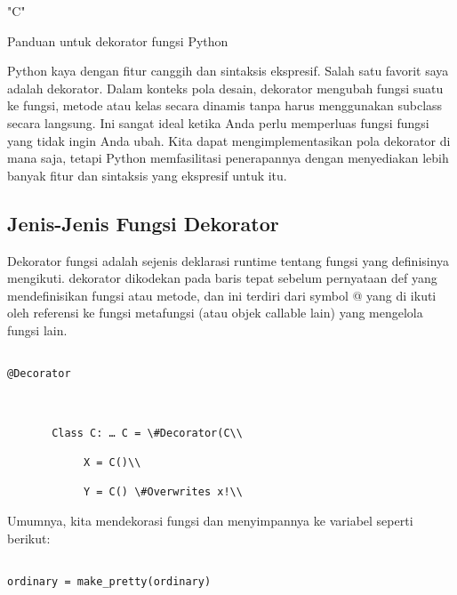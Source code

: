 "C"





Panduan untuk dekorator fungsi Python

Python kaya dengan fitur canggih dan sintaksis ekspresif. Salah satu favorit saya adalah dekorator. Dalam konteks pola desain, dekorator mengubah fungsi suatu ke fungsi, metode atau kelas secara dinamis tanpa harus menggunakan subclass secara langsung. Ini sangat ideal ketika Anda perlu memperluas fungsi fungsi yang tidak ingin Anda ubah. Kita dapat mengimplementasikan pola dekorator di mana saja, tetapi Python memfasilitasi penerapannya dengan menyediakan lebih banyak fitur dan sintaksis yang ekspresif untuk itu.



\subsection{Jenis-Jenis Fungsi Dekorator}





Dekorator fungsi adalah sejenis deklarasi runtime tentang fungsi yang definisinya mengikuti. dekorator dikodekan pada baris tepat sebelum pernyataan def yang mendefinisikan fungsi atau metode, dan ini terdiri dari symbol @ yang di ikuti oleh referensi ke fungsi metafungsi (atau objek callable lain) yang mengelola fungsi lain.





\begin{verbatim}

@Decorator



       Class C: … C = \#Decorator(C\\

            X = C()\\

            Y = C() \#Overwrites x!\\

\end{verbatim}

            

Umumnya, kita mendekorasi fungsi dan menyimpannya ke variabel seperti berikut:

\begin{verbatim}

ordinary = make_pretty(ordinary)

\end{verbatim}




